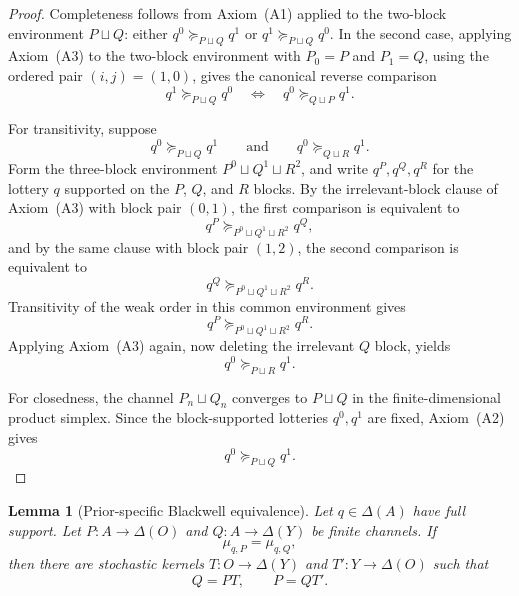 \documentclass[11pt,a4paper]{article}
\newtheorem{lemma}[theorem]{Lemma}
\theoremstyle{definition}
\newcommand{\1}{\mathbf 1}
\begin{document}
\begin{proof}
Completeness follows from Axiom~\textup{(A1)} applied to the two-block environment $P\sqcup Q$: either
$q^0\succeq_{P\sqcup Q}q^1$ or $q^1\succeq_{P\sqcup Q}q^0$.  In the second case, applying
Axiom~\textup{(A3)} to the two-block environment with $P_0=P$ and $P_1=Q$, using the ordered pair $(i,j)=(1,0)$,
gives the canonical reverse comparison
\[
q^1\succeq_{P\sqcup Q}q^0
\quad\Longleftrightarrow\quad
q^0\succeq_{Q\sqcup P}q^1.
\]

For transitivity, suppose
\[
q^0\succeq_{P\sqcup Q}q^1
\qquad\text{and}\qquad
q^0\succeq_{Q\sqcup R}q^1.
\]
Form the three-block environment $P^0\sqcup Q^1\sqcup R^2$, and write $q^P,q^Q,q^R$ for the lottery $q$ supported on
the $P$, $Q$, and $R$ blocks.  By the irrelevant-block clause of Axiom~\textup{(A3)} with block pair $(0,1)$, the first
comparison is equivalent to
\[
q^P\succeq_{P^0\sqcup Q^1\sqcup R^2}q^Q,
\]
and by the same clause with block pair $(1,2)$, the second comparison is equivalent to
\[
q^Q\succeq_{P^0\sqcup Q^1\sqcup R^2}q^R.
\]
Transitivity of the weak order in this common environment gives
\[
q^P\succeq_{P^0\sqcup Q^1\sqcup R^2}q^R.
\]
Applying Axiom~\textup{(A3)} again, now deleting the irrelevant $Q$ block, yields
\[
q^0\succeq_{P\sqcup R}q^1.
\]

For closedness, the channel $P_n\sqcup Q_n$ converges to $P\sqcup Q$ in the finite-dimensional product simplex.  Since
the block-supported lotteries $q^0,q^1$ are fixed, Axiom~\textup{(A2)} gives
\[
q^0\succeq_{P\sqcup Q}q^1.
\]
\end{proof}

\begin{lemma}[Prior-specific Blackwell equivalence]\label{lem:blackwell}
Let $q\in\Delta(A)$ have full support.  Let $P:A\to\Delta(O)$ and $Q:A\to\Delta(Y)$ be finite channels.  If
\[
\mu_{q,P}=\mu_{q,Q},
\]
then there are stochastic kernels $T:O\to\Delta(Y)$ and $T':Y\to\Delta(O)$ such that
\[
Q=PT,
\qquad
P=QT'.
\]
\end{lemma}
\end{document}
